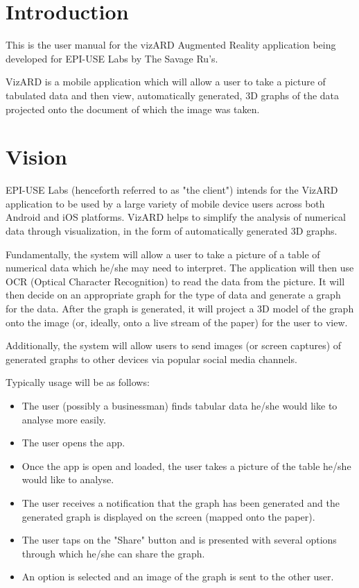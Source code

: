 \documentclass[a4paper,12pt]{article}
\begin{document}
\newpage

\tableofcontents

\newpage

\section{Introduction}

This is the user manual for the vizARD Augmented Reality application being developed for EPI-USE Labs by The Savage Ru's.

VizARD is a mobile application which will allow a user to take a picture of tabulated data and then view, automatically generated, 3D graphs of the data projected onto the document of which the image was taken.


\section{Vision}
EPI-USE Labs (henceforth referred to as "the client") intends for the VizARD application to be used by a large variety of mobile device users across both Android and iOS platforms. VizARD helps to simplify the analysis of numerical data through visualization, in the form of automatically generated 3D graphs.

Fundamentally, the system will allow a user to take a picture of a table of numerical data which he/she may need to interpret. The application will then use OCR (Optical Character Recognition) to read the data from the picture. It will then decide on an appropriate graph for the type of data and generate a graph for the data. After the graph is generated, it will project a 3D model of the graph onto the image (or, ideally, onto a live stream of the paper) for the user to view.

Additionally, the system will allow users to send images (or screen captures) of generated graphs to other devices via popular social media channels.

Typically usage will be as follows:
\begin{itemize}
	\item The user (possibly a businessman) finds tabular data he/she would like to analyse more easily.
	\item The user opens the app.
	\item Once the app is open and loaded, the user takes a picture of the table he/she would like to analyse.
	\item The user receives a notification that the graph has been generated and the generated graph is displayed on the screen (mapped onto the paper).
	\item The user taps on the "Share" button and is presented with several options through which he/she can share the graph.
	\item An option is selected and an image of the graph is sent to the other user.
\end{itemize}
\end{document}
